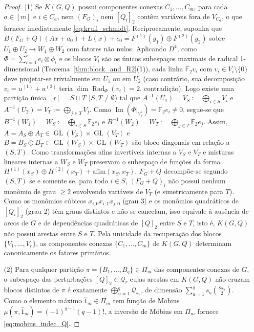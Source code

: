 \documentclass[11pt,a4paper]{article}
\theoremstyle{definition}
\theoremstyle{remark}
\newcommand{\F}{\mathbb{F}_2}
\newcommand{\Rad}{\operatorname{Rad}}
\newcommand{\GL}{\operatorname{GL}}
\begin{document}
\begin{proof}
(1) Se $K(G,Q)$ possui componentes conexas $C_1,\dots,C_m$, para cada $a \in [m]$ e $i \in C_a$, nem $(F_G)_i$ nem $[Q_i]_2$ contêm variáveis fora de $V_{C_a}$, o que fornece imediatamente \eqref{eq:krull_schmidt}. Reciprocamente, suponha que $B(F_G+Q)(Ax+a_0) + L(x) + c_0 = F^{(1)}(y_1) \oplus F^{(2)}(y_2)$ sobre $U_1 \oplus U_2 \to W_1 \oplus W_2$ com fatores não nulos. Aplicando $D^4$, como $\Phi = \sum_{i=1}^r e_i \otimes \phi_i$ e os blocos $V_i$ são os únicos subespaços maximais de radical 1-dimensional (Teorema~\ref{thm:block_and_R2}(1)), cada linha $\F v_i$ com $v_i \in V_i \setminus \{0\}$ deve projetar-se trivialmente em $U_1$ ou em $U_2$ (caso contrário, sua decomposição $v_i = u^{(1)} + u^{(2)}$ teria $\dim\Rad_\Phi(v_i) = 2$, contradição). Logo existe uma partição única $[r] = S \sqcup T$ ($S, T \neq \emptyset$) tal que $A^{-1}(U_1) = V_S := \bigoplus_{i\in S} V_i$ e $A^{-1}(U_2) = V_T := \bigoplus_{j\in T} V_j$. Como $\operatorname{Im}(\Phi|_{V_i^4}) = \F e_i \neq 0$, segue-se que $B^{-1}(W_1) = W_S := \bigoplus_{i\in S} \F e_i$ e $B^{-1}(W_2) = W_T := \bigoplus_{j\in T} \F e_j$. Assim, $A = A_S \oplus A_T \in \GL(V_S) \times \GL(V_T)$ e $B = B_S \oplus B_T \in \GL(W_S) \times \GL(W_T)$ são bloco-diagonais em relação a $(S,T)$. Como transformações afins invertíveis internas a $V_S$ e $V_T$ e misturas lineares internas a $W_S$ e $W_T$ preservam o subespaço de funções da forma $H^{(1)}(x_S) \oplus H^{(2)}(x_T) + \mathrm{afim}(x_S, x_T)$, $F_G+Q$ decompõe-se segundo $(S,T)$ se e somente se, para todo $i \in S$, $(F_G+Q)_i$ não possui nenhum monômio de grau $\ge 2$ envolvendo variáveis de $V_T$ (e simetricamente para $T$). Como os monômios cúbicos $x_{i,0}x_{i,1}x_{j,0}$ (grau $3$) e os monômios quadráticos de $[Q_i]_2$ (grau $2$) têm graus distintos e não se cancelam, isso equivale à ausência de arcos de $G$ e de dependências quadráticas de $[Q]_2$ entre $S$ e $T$, isto é, $K(G,Q)$ não possui arestas entre $S$ e $T$. Pela unicidade da recuperação dos blocos $\{V_1,\dots,V_r\}$, as componentes conexas $\{C_1,\dots,C_m\}$ de $K(G,Q)$ determinam canonicamente os fatores primários.

(2) Para qualquer partição $\pi = \{B_1,\dots,B_q\} \in \Pi_m$ das componentes conexas de $G$, o subespaço das perturbações $[Q]_2 \in \mathcal{Q}_r$ cujas arestas em $K(G,Q)$ não cruzam blocos distintos de $\pi$ é exatamente $\bigoplus_{u=1}^q \mathcal{Q}_{s_u}$, de dimensão $\sum_{u=1}^q s_u\binom{8s_u}{2}$. Como o elemento máximo $\hat{1}_m \in \Pi_m$ tem função de Möbius $\mu(\pi, \hat{1}_m) = (-1)^{q-1}(q-1)!$, a inversão de Möbius em $\Pi_m$ fornece \eqref{eq:mobius_indec_Q}.


\end{proof}
\end{document}
